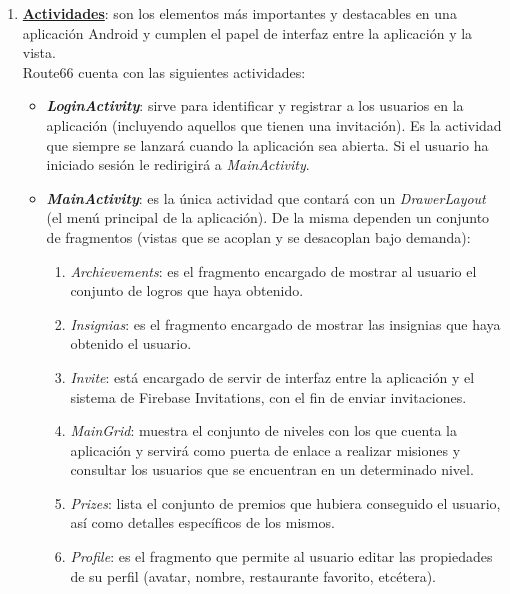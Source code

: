 \documentclass[twoside]{report}
\begin{document}
\begin{enumerate}
\item \textbf{\underline{Actividades}}: son los elementos más importantes y destacables en una aplicación Android y cumplen el papel de interfaz entre la aplicación y la vista.\\
Route66 cuenta con las siguientes actividades:

	\begin{itemize}
	\item \textbf{\textit{LoginActivity}}: sirve para identificar y registrar a los usuarios en la aplicación (incluyendo aquellos que tienen una invitación). Es la actividad que siempre se lanzará cuando la aplicación sea abierta. Si el usuario ha iniciado sesión le redirigirá  a \textit{MainActivity}.
	
	\item \textbf{\textit{MainActivity}}: es la única actividad que contará con un \textit{DrawerLayout} (el menú principal de la aplicación). De la misma dependen un conjunto de fragmentos (vistas que se acoplan y se desacoplan bajo demanda):
	
		\begin{enumerate}
			\item \textit{Archievements}: es el fragmento encargado de mostrar al usuario el conjunto de logros que haya obtenido.
			
			\item \textit{Insignias}: es el fragmento encargado de mostrar las insignias que haya obtenido el usuario.
			
			\item \textit{Invite}: está encargado de servir de interfaz entre la aplicación y el sistema de Firebase Invitations, con el fin de enviar invitaciones.
			
			\item \textit{MainGrid}: muestra el conjunto de niveles con los que cuenta la aplicación y servirá como puerta de enlace a realizar misiones y consultar los usuarios que se encuentran en un determinado nivel.
			
			\item \textit{Prizes}: lista el conjunto de premios que hubiera conseguido el usuario, así como detalles específicos de los mismos.
			
			\item \textit{Profile}: es el fragmento que permite al usuario editar las propiedades de su perfil (avatar, nombre, restaurante favorito, etcétera).
			

\end{enumerate}
\end{itemize}
\end{enumerate}
\end{document}
